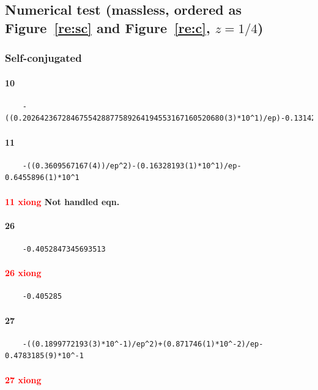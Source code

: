 \documentclass{article}
\newcommand{\WN}[1]{\textcolor{RawSienna}{#1}}
\newcommand{\WNNH}{\WN{Not handled eqn. }}
\begin{document}
\subsection{Numerical test (massless, ordered as Figure~\ref{re:sc} and Figure~\ref{re:c}, $z=1/4$)}
\subsubsection{Self-conjugated}
\paragraph{10}
\begin{verbatim}
	-((0.2026423672846755428877589264194553167160520680(3)*10^1)/ep)-0.13142890977(7)*10^2
\end{verbatim}
\paragraph{11}
\begin{verbatim}
	-((0.3609567167(4))/ep^2)-(0.16328193(1)*10^1)/ep-0.6455896(1)*10^1
\end{verbatim}
\paragraph{\textcolor{red}{11 xiong}	\WNNH}

\paragraph{26}
\begin{verbatim}
	-0.4052847345693513
\end{verbatim}
\paragraph{\textcolor{red}{26 xiong}}
\begin{verbatim}
	-0.405285
\end{verbatim}
\paragraph{27}
\begin{verbatim}
	-((0.1899772193(3)*10^-1)/ep^2)+(0.871746(1)*10^-2)/ep-0.4783185(9)*10^-1
\end{verbatim}
\paragraph{\textcolor{red}{27 xiong}}
\end{document}
